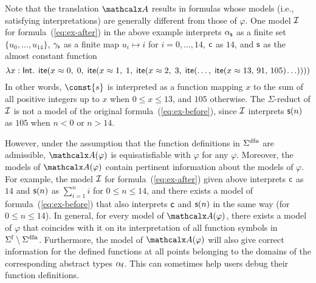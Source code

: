 \newcommand\badlambda{\lambda x : \typeint.\allowbreak\;\, \lite( x \teq 0,\allowbreak\; 0,\allowbreak\;
  \lite( x \teq 1,\allowbreak\; 1,\allowbreak\;
    \lite( x \teq 2,\allowbreak\; 3,\allowbreak\;
      \lite(\dotsc,\allowbreak\; \lite( x \teq 13,\allowbreak\, 91,\allowbreak\, 105 )\negvthinspace \ldots ))))}

Note that the translation $\conv$ results in formulas whose models
(i.e., satisfying interpretations) are generally different from those of $\varphi$.
One model $\mathcal{I}$ for formula~(\ref{eq:ex-after}) in the above example interprets
$\alpha_{\mathsf{s}}$ as a finite set $\{ u_0, \dotsc, u_{14} \}$,
$\gamma_{\mathsf{s}}$ as a finite map $u_i \mapsto i$ for $i = 0, \dotsc, 14$,
$\mathsf{c}$ as $14$,
and $\mathsf{s}$ as the almost constant function
%
\[\badlambda\]
%
In other words, $\const{s}$ is interpreted as a function mapping $x$ to the sum
of all positive integers up to $x$ when $0 \leq x \leq 13$, and $105$
otherwise.
The $\Sigma$-reduct of $\mathcal{I}$ is not a model of the original formula~(\ref{eq:ex-before}),
since $\mathcal{I}$
interprets $\mathsf{s}( n )$ as $105$ when $n < 0$ or $n > 14$.

However, under the assumption that the function definitions in
$\sfundefs{\Sigma}$ are admissible, %
$\conv(\varphi)$ is equisatisfiable with $\varphi$ for any $\varphi$.
Moreover, the models of $\conv( \varphi )$ contain
pertinent information about the models of $\varphi$. For example, the model
$\mathcal{I}$ for formula~(\ref{eq:ex-after}) given above interprets $\mathsf{c}$ as $14$
and $\mathsf{s}(n)$ as $\sum_{i=1}^n i$ for $0 \le n \le 14$,
and there exists a model of formula~(\ref{eq:ex-before}) that also interprets
$\mathsf{c}$ and $\mathsf{s}(n)$ in the same way (for $0 \le n \le 14$).
In general, for every model of $\conv( \varphi )$,
there exists a model of $\varphi$ that
coincides with it on its interpretation of all
function symbols in $\sfuns{\Sigma} \setminus \sfundefs{\Sigma}$.
Furthermore, the model of $\conv( \varphi )$ will
also give correct information for the defined functions at all points belonging
to the domains of the corresponding abstract types $\alpha_{\mathsf{f}}$.
This can sometimes help users debug their
function definitions.

